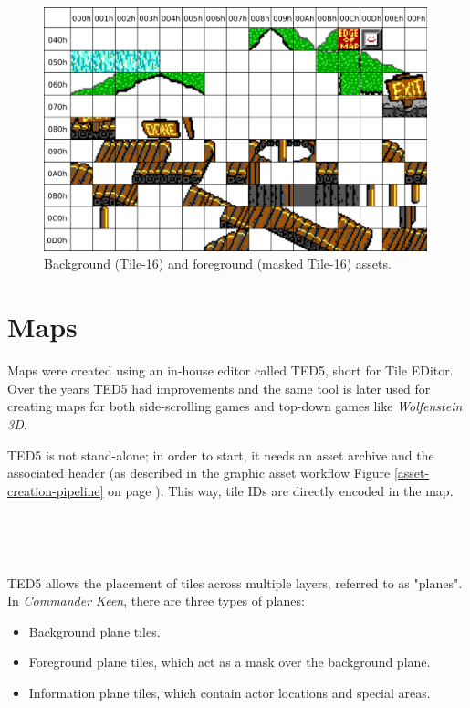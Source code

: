 \documentclass[book.tex]{subfiles}
\begin{document}
\begin{figure}[H] 
  \centering 
  \includegraphics[width=0.99\textwidth, frame]{screenshots_300dpi/tile16M_assets.png}
  \caption{Background (Tile-16) and foreground (masked Tile-16) assets.}
  \label{fig:tile16_assets}
\end{figure} 



\section{Maps}
Maps were created using an in-house editor called TED5, short for Tile EDitor. Over the years TED5 had improvements and the same tool is later used for creating maps for both side-scrolling games and top-down games like \textit{Wolfenstein 3D}.\\
\par
 TED5 is not stand-alone; in order to start, it needs an asset archive and the  associated header (as described in the graphic asset workflow Figure \ref{asset-creation-pipeline} on page \pageref{asset-creation-pipeline}). This way, tile IDs are directly encoded in the map.\\

 
 \par
 \\
 \par
{}\\
 
 \par
TED5 allows the placement of tiles across multiple layers, referred to as "planes". In \textit{Commander Keen}, there are three types of planes: 
\begin{itemize}
  \item Background plane tiles.
  \item Foreground plane tiles, which act as a mask over the background plane.
  \item Information plane tiles, which contain actor locations and special areas.
\end{itemize}
\end{document}
